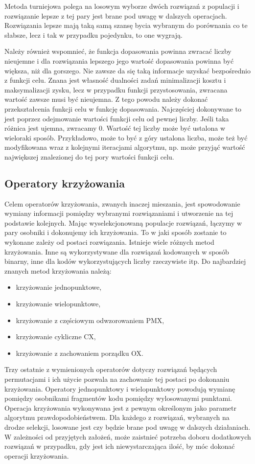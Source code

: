Metoda turniejowa polega na losowym wyborze dwóch rozwiązań z populacji i rozwiązanie lepsze z tej pary jest brane pod uwagę w dalszych operacjach. Rozwiązania lepsze mają taką samą szansę bycia wybranym do porównania co te słabsze, lecz i tak w przypadku pojedynku, to one wygrają.

Należy również wspomnieć, że funkcja dopasowania powinna zwracać liczby nieujemne i dla rozwiązania lepszego jego wartość dopasowania powinna być większa, niż dla gorszego. Nie zawsze da się taką informacje uzyskać bezpośrednio z funkcji celu. Znana jest własność dualności zadań minimalizacji kosztu i maksymalizacji zysku, lecz w przypadku funkcji przystosowania, zwracana wartość zawsze musi być nieujemna. Z tego powodu należy dokonać przekształcenia funkcji celu w funkcję dopasowania. Najczęściej  dokonywane to jest poprzez odejmowanie wartości funkcji celu od pewnej liczby. Jeśli taka różnica jest ujemna, zwracamy 0. Wartość tej liczby może być ustalona w wieloraki sposób. Przykładowo, może to być z góry ustalona liczba, może też być modyfikowana wraz z kolejnymi iteracjami algorytmu, np. może przyjąć wartość największej znalezionej do tej pory wartości funkcji celu.

\subsection{Operatory krzyżowania}
Celem operatorów krzyżowania, zwanych inaczej mieszania, jest spowodowanie wymiany informacji pomiędzy wybranymi rozwiązaniami i utworzenie na tej podstawie kolejnych. Mając wyselekcjonowaną populacje rozwiązań, łączymy w pary osobniki i dokonujemy ich krzyżowania. To w jaki sposób zostanie to wykonane zależy od postaci rozwiązania. Istnieje wiele różnych metod krzyżowania. Inne są wykorzystywane dla rozwiązań kodowanych w sposób binarny, inne dla kodów wykorzystujących liczby rzeczywiste itp. Do najbardziej znanych metod krzyżowania należą:
\begin{itemize}
\item krzyżowanie jednopunktowe,
\item krzyżowanie wielopunktowe,
\item krzyżowanie z częściowym odwzorowaniem PMX,
\item krzyżowanie cykliczne CX,
\item krzyżowanie z zachowaniem porządku OX.
\end{itemize}

Trzy ostatnie z wymienionych operatorów dotyczy rozwiązań będących permutacjami i ich użycie pozwala na zachowanie tej postaci po dokonaniu krzyżowania. Operatory jednopunktowy i wielopunktowy powodują wymianę pomiędzy osobnikami fragmentów kodu pomiędzy wylosowanymi punktami. Operacja krzyżowania wykonywana jest z pewnym określonym jako parametr algorytmu prawdopodobieństwem. Dla każdego z rozwiązań, wybranych na drodze selekcji, losowane jest czy będzie brane pod uwagę w dalszych działaniach. W zależności od przyjętych założeń, może zaistnieć potrzeba doboru dodatkowych rozwiązań w przypadku, gdy jest ich niewystarczająca ilość, by móc dokonać operacji krzyżowania.

